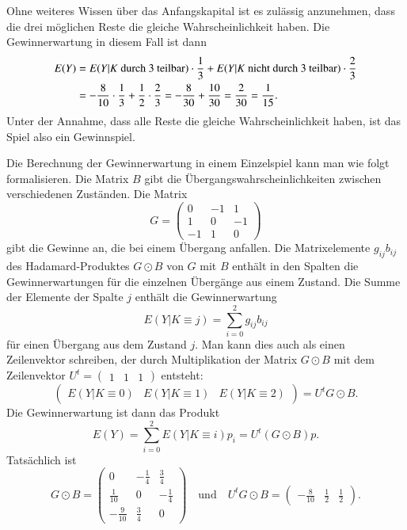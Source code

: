 Ohne weiteres Wissen über das Anfangskapital ist es zulässig anzunehmen,
dass die drei möglichen Reste die gleiche Wahrscheinlichkeit haben.
Die Gewinnerwartung in diesem Fall ist dann
\begin{align}
E(Y)
&=
E(Y|\text{$K$ durch $3$ teilbar}) \cdot \frac13
+
E(Y|\text{$K$ nicht durch $3$ teilbar}) \cdot \frac23
\notag
\\
&=
-\frac{8}{10}\cdot\frac{1}{3}
+
\frac{1}{2}\cdot\frac{2}{3}
=
-\frac{8}{30}+\frac{10}{30}
=
\frac{2}{30}
=
\frac{1}{15}.
\label{buch:wahrscheinlichkeit:eqn:Beinzelerwartung}
\end{align}
Unter der Annahme, dass alle Reste die gleiche Wahrscheinlichkeit haben,
ist das Spiel also ein Gewinnspiel.

Die Berechnung der Gewinnerwartung in einem Einzelspiel kann man 
wie folgt formalisieren.
Die Matrix $B$ gibt die Übergangswahrscheinlichkeiten zwischen
verschiedenen Zuständen.
Die Matrix 
\[
G=\begin{pmatrix}
 0&-1& 1\\
 1& 0&-1\\
-1& 1& 0
\end{pmatrix}
\]
gibt die Gewinne an, die bei einem Übergang anfallen.
Die Matrixelemente $g_{ij}b_{ij}$ des Hadamard-Produktes 
$G\odot B$
von $G$ mit $B$ enthält in den Spalten die Gewinnerwartungen
für die einzelnen Übergänge aus einem Zustand.
Die Summe der Elemente der Spalte $j$ enthält die Gewinnerwartung
\[
E(Y|K\equiv j)
=
\sum_{i=0}^2 g_{ij}b_{ij}
\]
für einen Übergang aus dem Zustand $j$.
Man kann dies auch als einen Zeilenvektor schreiben, der durch Multiplikation
der Matrix $G\odot B$ mit dem Zeilenvektor
$U^t=\begin{pmatrix}1&1&1\end{pmatrix}$
entsteht:
\[
\begin{pmatrix}
E(Y|K\equiv 0)&
E(Y|K\equiv 1)&
E(Y|K\equiv 2)
\end{pmatrix}
=
U^t
G\odot B.
\]
Die Gewinnerwartung ist dann das Produkt
\[
E(Y)
=
\sum_{i=0}^2
E(Y|K\equiv i) p_i
=
U^t
(G\odot B)p.
\]
Tatsächlich ist
\[
G\odot B
=
\begin{pmatrix}
 0          &-\frac14 & \frac34\\
 \frac1{10} & 0       &-\frac14\\
-\frac9{10} & \frac34 & 0
\end{pmatrix}
\quad\text{und}\quad
U^t G\odot B
=
\begin{pmatrix}-\frac{8}{10}&\frac12&\frac12\end{pmatrix}.
\]

